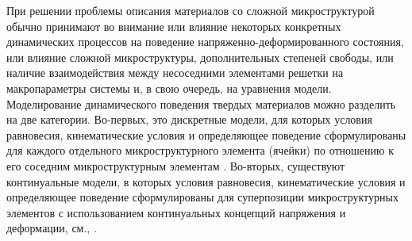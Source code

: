 При решении проблемы описания материалов со сложной микроструктурой обычно принимают во внимание или влияние некоторых конкретных динамических процессов на поведение напряженно-деформированного состояния, или влияние сложной микроструктуры, дополнительных степеней свободы, или наличие взаимодействия между несоседними элементами решетки на макропараметры системы и, в свою очередь, на уравнения модели.
Моделирование динамического поведения твердых материалов можно разделить на две категории. Во-первых, это дискретные модели, для которых условия равновесия, кинематические условия и определяющее поведение сформулированы для каждого отдельного микроструктурного элемента (ячейки) по отношению к его соседним микроструктурным элементам \cite{bound_Born, AskMetr, bound_askar, Ostoja}. Во-вторых, существуют континуальные модели, в которых условия равновесия, кинематические условия и определяющее поведение сформулированы для суперпозиции микроструктурных элементов с использованием континуальных концепций напряжения и деформации, см., \cite{Maug, engbook97, Erofeyev2003}.
